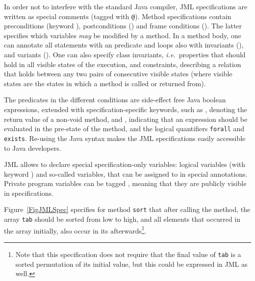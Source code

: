 

In order not to interfere with the standard Java compiler, JML
specifications are written as special comments (tagged with
\texttt{@}). Method specifications contain preconditions (keyword
), postconditions () and frame
conditions (). The latter specifies which variables
\emph{may} be modified by a method. In a method body, one can
annotate all statements with an  predicate and loops
also with invariants (), and variants
(). One can also specify class invariants,
\emph{i.e.}\ properties that should hold in all visible states of the
execution, and constraints, describing a relation that 
holds between any two pairs of consecutive visible states (where
visible states are the states in which a method is called or returned
from).

The predicates in the different conditions are side-effect free Java
boolean expressions, extended with specification-specific keywords,
such as , denoting the return value of a non-void
method, and , indicating that an expression should be
evaluated in the pre-state of the method, and the logical quantifiers
\texttt{\bsl forall} and \texttt{\bsl exists}. Re-using the Java syntax
makes the JML specifications easily accessible to Java developers.

JML allows to declare special specification-only variables: logical
variables (with keyword ) and so-called 
variables, that can be assigned to in special 
annotations. Private program variables can be tagged
, meaning that they are publicly visible in 
specifications.

Figure~\ref{FigJMLSpec} specifies for method \texttt{sort} that after
calling the method, the array \texttt{tab} should be sorted from low
to high, and all elements that occurred in the array initially, also
occur in its afterwards\footnote{Note that this specification does not
require that the final value of \texttt{tab} is a sorted permutation
of its initial value, but this could be expressed in JML as well.}.

